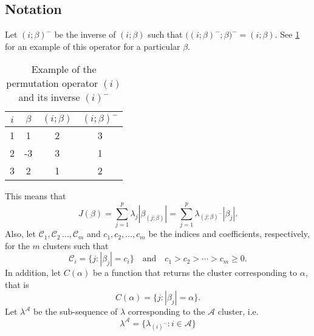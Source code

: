 \subsection{Notation}\label{sec:notation}

Let \((i;\beta)^{-}\) be the inverse of \((i;\beta)\) such that
\(\big((i;\beta)^-;\beta\big)^- = (i;\beta)\). See \cref{tab:permutation-example} for an
example of this operator for a particular \(\beta\).
\begin{table}
  \centering
  \caption{Example of the permutation operator \((i)\) and its inverse
    \((i)^-\)\label{tab:permutation-example}}
  \begin{tabular}{cccc}
    \toprule
    \(i\) & \(\beta\) & \((i; \beta)\) & \((i; \beta)^-\) \\
    \midrule
    1     & 1         & 2              & 3                \\
    2     & -3        & 3              & 1                \\
    3     & 2         & 1              & 2                \\
    \bottomrule
  \end{tabular}
\end{table}
This means that
\[
  J(\beta) = \sum_{j=1}^p \lambda_j |\beta_{(j;\beta)}|
  = \sum_{j=1}^p \lambda_{(j;\beta)^-}|\beta_j|.
\]
Also, let \(\mathcal{C}_1, \mathcal{C}_2\, \dots, \mathcal{C}_m\) and \(c_1,
c_2, \dots, c_m\) be the indices and coefficients, respectively, for the \(m\)
clusters such that
\[
  \mathcal{C}_i = \{j : |\beta_j| = c_i\} \quad \text{and} \quad
  c_1 > c_2 > \cdots > c_m \geq 0.
\]
In addition, let \(C(\alpha)\) be a function that returns the
cluster corresponding to \(\alpha\), that is
\[
  C(\alpha) = \{j : |\beta_j| = \alpha\}.
\]
Let \(\lambda^{\mathcal{A}}\) be the sub-sequence of
\(\lambda\) corresponding to the \(\mathcal{A}\) cluster, i.e.
\[
  \lambda^\mathcal{A} = \{\lambda_{(i)^-} : i \in \mathcal{A}\}
\]




